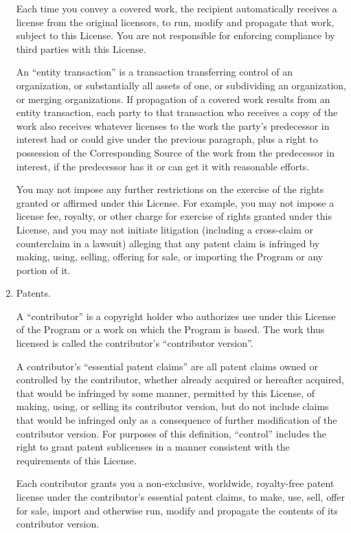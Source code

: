 \documentclass[11pt]{article}
\begin{document}
\begin{enumerate}
Each time you convey a covered work, the recipient automatically
receives a license from the original licensors, to run, modify and
propagate that work, subject to this License.  You are not responsible
for enforcing compliance by third parties with this License.

An ``entity transaction'' is a transaction transferring control of an
organization, or substantially all assets of one, or subdividing an
organization, or merging organizations.  If propagation of a covered
work results from an entity transaction, each party to that
transaction who receives a copy of the work also receives whatever
licenses to the work the party's predecessor in interest had or could
give under the previous paragraph, plus a right to possession of the
Corresponding Source of the work from the predecessor in interest, if
the predecessor has it or can get it with reasonable efforts.

You may not impose any further restrictions on the exercise of the
rights granted or affirmed under this License.  For example, you may
not impose a license fee, royalty, or other charge for exercise of
rights granted under this License, and you may not initiate litigation
(including a cross-claim or counterclaim in a lawsuit) alleging that
any patent claim is infringed by making, using, selling, offering for
sale, or importing the Program or any portion of it.

\item Patents.

A ``contributor'' is a copyright holder who authorizes use under this
License of the Program or a work on which the Program is based.  The
work thus licensed is called the contributor's ``contributor version''.

A contributor's ``essential patent claims'' are all patent claims
owned or controlled by the contributor, whether already acquired or
hereafter acquired, that would be infringed by some manner, permitted
by this License, of making, using, or selling its contributor version,
but do not include claims that would be infringed only as a
consequence of further modification of the contributor version.  For
purposes of this definition, ``control'' includes the right to grant
patent sublicenses in a manner consistent with the requirements of
this License.

Each contributor grants you a non-exclusive, worldwide, royalty-free
patent license under the contributor's essential patent claims, to
make, use, sell, offer for sale, import and otherwise run, modify and
propagate the contents of its contributor version.


\end{enumerate}
\end{document}
